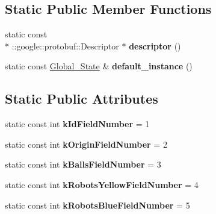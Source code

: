 \subsection*{Static Public Member Functions}
\begin{DoxyCompactItemize}
\item 
\hypertarget{classvss__state_1_1Global__State_af5963eb38d472f2508e180fdf42c4a22}{static const \\*
\-::google\-::protobuf\-::\-Descriptor $\ast$ {\bfseries descriptor} ()}\label{classvss__state_1_1Global__State_af5963eb38d472f2508e180fdf42c4a22}

\item 
\hypertarget{classvss__state_1_1Global__State_a1bf08b600180f360bcd37c58f3e50b16}{static const \hyperlink{classvss__state_1_1Global__State}{Global\-\_\-\-State} \& {\bfseries default\-\_\-instance} ()}\label{classvss__state_1_1Global__State_a1bf08b600180f360bcd37c58f3e50b16}

\end{DoxyCompactItemize}
\subsection*{Static Public Attributes}
\begin{DoxyCompactItemize}
\item 
\hypertarget{classvss__state_1_1Global__State_adc3acf2d9111dd7e0e442b1c8f8743ab}{static const int {\bfseries k\-Id\-Field\-Number} = 1}\label{classvss__state_1_1Global__State_adc3acf2d9111dd7e0e442b1c8f8743ab}

\item 
\hypertarget{classvss__state_1_1Global__State_a124e80222f404a8607d383c6b626b98a}{static const int {\bfseries k\-Origin\-Field\-Number} = 2}\label{classvss__state_1_1Global__State_a124e80222f404a8607d383c6b626b98a}

\item 
\hypertarget{classvss__state_1_1Global__State_a7ccc5ad24ae6460151ee94fd5f3800f5}{static const int {\bfseries k\-Balls\-Field\-Number} = 3}\label{classvss__state_1_1Global__State_a7ccc5ad24ae6460151ee94fd5f3800f5}

\item 
\hypertarget{classvss__state_1_1Global__State_a3dbd17117a81ad417c69ca945668edaa}{static const int {\bfseries k\-Robots\-Yellow\-Field\-Number} = 4}\label{classvss__state_1_1Global__State_a3dbd17117a81ad417c69ca945668edaa}

\item 
\hypertarget{classvss__state_1_1Global__State_a69fd6df3aa2671364cb92838e3824e81}{static const int {\bfseries k\-Robots\-Blue\-Field\-Number} = 5}\label{classvss__state_1_1Global__State_a69fd6df3aa2671364cb92838e3824e81}

\end{DoxyCompactItemize}
